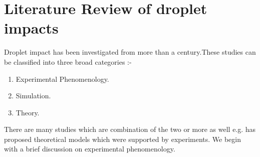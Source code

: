 
\section{Literature Review of droplet impacts}

Droplet impact has been investigated from more than a century.These studies can be classified into three broad categories :- 
\begin{enumerate}
 \item Experimental Phenomenology.
 \item Simulation.
 \item Theory.
\end{enumerate}

There are many studies which are combination of the two or more as well e.g. \cite{Mao1997} has proposed theoretical models which were supported by experiments. We
begin with a brief discussion on experimental phenomenology.

